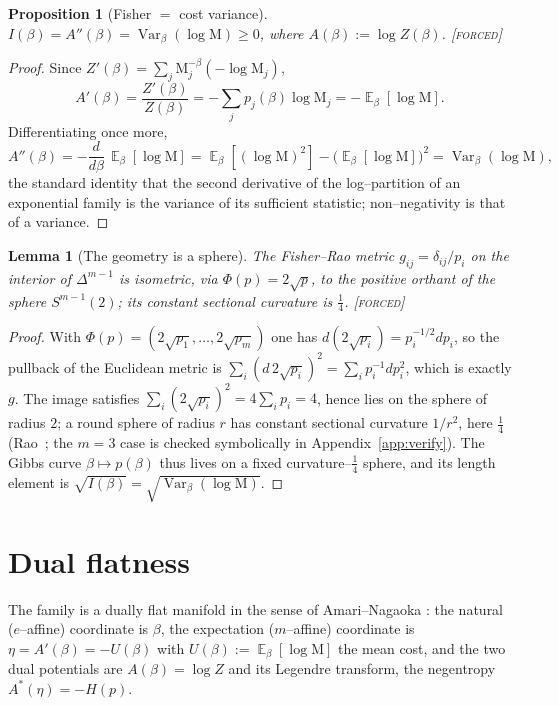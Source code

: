 \documentclass[11pt]{article}
\newtheorem{proposition}[theorem]{Proposition}
\newtheorem{lemma}[theorem]{Lemma}
\theoremstyle{definition}
\newcommand{\Mah}{\mathrm{M}}
\newcommand{\Var}{\operatorname{Var}}
\newcommand{\E}{\operatorname{\mathbb{E}}}
\newcommand{\forcedtag}{{\scshape [forced]}}
\begin{document}
\begin{proposition}[Fisher $=$ cost variance]\label{prop:fisher}
$I(\beta)=A''(\beta)=\Var_\beta(\log\Mah)\ge0$, where $A(\beta):=\log Z(\beta)$. \forcedtag
\end{proposition}
\begin{proof}
Since $Z'(\beta)=\sum_j\Mah_j^{-\beta}(-\log\Mah_j)$,
\[
A'(\beta)=\frac{Z'(\beta)}{Z(\beta)}=-\sum_j p_j(\beta)\log\Mah_j=-\E_\beta[\log\Mah].
\]
Differentiating once more,
\[
A''(\beta)=-\frac{d}{d\beta}\,\E_\beta[\log\Mah]
=\E_\beta[(\log\Mah)^2]-\big(\E_\beta[\log\Mah]\big)^2=\Var_\beta(\log\Mah),
\]
the standard identity that the second derivative of the log--partition of an exponential family is
the variance of its sufficient statistic; non--negativity is that of a variance.
\end{proof}

\begin{lemma}[The geometry is a sphere]\label{lem:sphere}
The Fisher--Rao metric $g_{ij}=\delta_{ij}/p_i$ on the interior of $\Delta^{m-1}$ is isometric, via
$\Phi(p)=2\sqrt p$, to the positive orthant of the sphere $S^{m-1}(2)$; its constant sectional
curvature is $\tfrac14$. \forcedtag
\end{lemma}
\begin{proof}
With $\Phi(p)=(2\sqrt{p_1},\dots,2\sqrt{p_m})$ one has $d(2\sqrt{p_i})=p_i^{-1/2}dp_i$, so the
pullback of the Euclidean metric is $\sum_i(d\,2\sqrt{p_i})^2=\sum_i p_i^{-1}dp_i^2$, which is exactly
$g$. The image satisfies $\sum_i(2\sqrt{p_i})^2=4\sum_i p_i=4$, hence lies on the sphere of radius
$2$; a round sphere of radius $r$ has constant sectional curvature $1/r^2$, here $\tfrac14$
(Rao~\cite{rao}; the $m=3$ case is checked symbolically in Appendix~\ref{app:verify}). The Gibbs
curve $\beta\mapsto p(\beta)$ thus lives on a fixed curvature--$\tfrac14$ sphere, and its length
element is $\sqrt{I(\beta)}=\sqrt{\Var_\beta(\log\Mah)}$.
\end{proof}

\section{Dual flatness}\label{sec:dual}
The family is a dually flat manifold in the sense of Amari--Nagaoka \cite{amari}: the natural
($e$--affine) coordinate is $\beta$, the expectation ($m$--affine) coordinate is
$\eta=A'(\beta)=-U(\beta)$ with $U(\beta):=\E_\beta[\log\Mah]$ the mean cost, and the two dual
potentials are $A(\beta)=\log Z$ and its Legendre transform, the negentropy $A^\ast(\eta)=-H(p)$.
\end{document}
